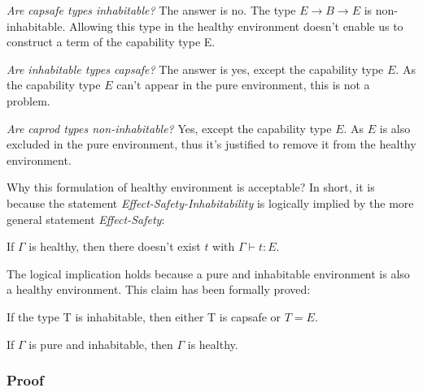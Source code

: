 \emph{Are capsafe types inhabitable?} The answer is no. The type
$E \to B \to E$ is non-inhabitable. Allowing this type in the healthy
environment doesn't enable us to construct a term of the capability
type E.

\emph{Are inhabitable types capsafe?} The answer is yes, except the
capability type $E$. As the capability type $E$ can't appear in the
pure environment, this is not a problem.

\emph{Are caprod types non-inhabitable?} Yes, except the capability
type $E$. As $E$ is also excluded in the pure environment, thus it's
justified to remove it from the healthy environment.


Why this formulation of healthy environment is acceptable? In short,
it is because the statement \emph{Effect-Safety-Inhabitability} is
logically implied by the more general statement \emph{Effect-Safety}:

\begin{definition}
  If $\Gamma$ is healthy, then there doesn't exist $t$ with
  $\Gamma \vdash t : E$.
\end{definition}

The logical implication holds because a pure and inhabitable
environment is also a healthy environment. This claim has been
formally proved:

\begin{lemma}
  If the type T is inhabitable, then either T is capsafe or $T = E$.
\end{lemma}

\begin{theorem}
  If $\Gamma$ is pure and inhabitable, then $\Gamma$ is healthy.
\end{theorem}


\subsubsection{Proof}

